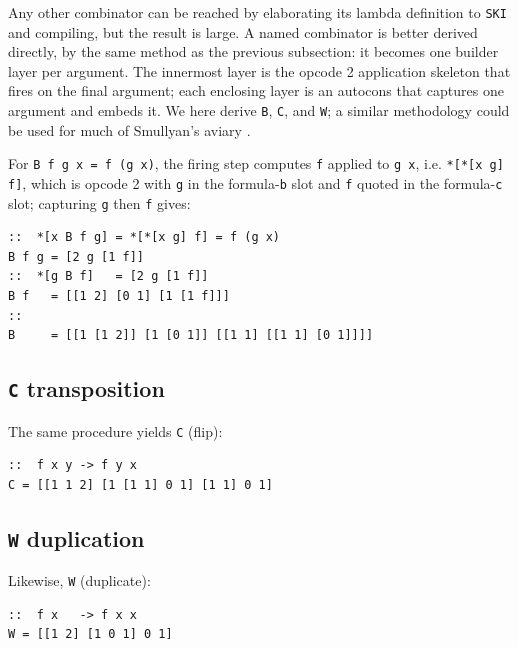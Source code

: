 \documentclass[twoside]{article}
\begin{document}
Any other combinator can be reached by elaborating its lambda definition to \texttt{SKI} and compiling, but the result is large.  A named combinator is better derived directly, by the same method as the previous subsection:  it becomes one builder layer per argument.  The innermost layer is the opcode 2 application skeleton that fires on the final argument; each enclosing layer is an autocons that captures one argument and embeds it.  We here derive \texttt{B}, \texttt{C}, and \texttt{W}; a similar methodology could be used for much of Smullyan's aviary \citep{Smullyan1985}.

For \lstinline[style=inlinecode]{B f g x = f (g x)}, the firing step computes \lstinline[style=inlinecode]{f} applied to \lstinline[style=inlinecode]{g x}, i.e. \lstinline[style=inlinecode]{*[*[x g] f]}, which is opcode 2 with \lstinline[style=inlinecode]{g} in the formula-\lstinline[style=inlinecode]{b} slot and \lstinline[style=inlinecode]{f} quoted in the formula-\lstinline[style=inlinecode]{c} slot; capturing \lstinline[style=inlinecode]{g} then \lstinline[style=inlinecode]{f} gives:

\begin{lstlisting}[style=listingblock]
::  *[x B f g] = *[*[x g] f] = f (g x)
B f g = [2 g [1 f]]
::  *[g B f]   = [2 g [1 f]]
B f   = [[1 2] [0 1] [1 [1 f]]]
::
B     = [[1 [1 2]] [1 [0 1]] [[1 1] [[1 1] [0 1]]]]
\end{lstlisting}

\subsection{\texttt{C} transposition}

The same procedure yields \texttt{C} (flip):

\begin{lstlisting}[style=listingblock]
::  f x y -> f y x
C = [[1 1 2] [1 [1 1] 0 1] [1 1] 0 1]
\end{lstlisting}

\subsection{\texttt{W} duplication}

Likewise, \texttt{W} (duplicate):

\begin{lstlisting}[style=listingblock]
::  f x   -> f x x
W = [[1 2] [1 0 1] 0 1]
\end{lstlisting}
\end{document}
